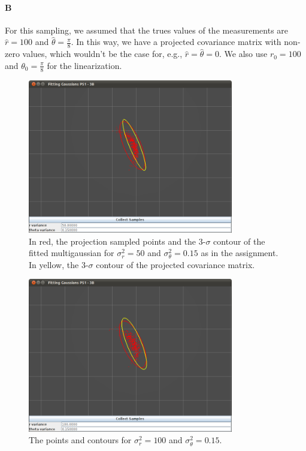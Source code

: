 \documentclass[12pt]{article}
\begin{document}
\paragraph{B} For this sampling, we assumed that the trues values of the measurements are $\hat{r}=100$ and $\hat{\theta}=\frac{\pi}{8}$. In this way, we have a projected covariance matrix with non-zero values, which wouldn't be the case for, e.g., $\hat{r}=\hat{\theta}=0$. We also use $r_0=100$ and $\theta_0=\frac{\pi}{8}$ for the linearization.

\begin{figure}
\centering
\includegraphics[width=0.8\textwidth]{figures/GaussianFit_50_0_15.png}
\caption{In red, the projection sampled points and the 3-$\sigma$ contour of the fitted multigaussian for $\sigma^2_r=50$ and $\sigma^2_\theta=0.15$ as in the assignment. In yellow, the 3-$\sigma$ contour of the projected covariance matrix.}
\label{fig:covplot_50_15}
\end{figure}

\begin{figure}
\centering
\includegraphics[width=0.8\textwidth]{figures/GaussianFit_100_0_15.png}
\caption{The points and contours for $\sigma^2_r=100$ and $\sigma^2_\theta=0.15$.}
\label{fig:covplot_100_15}
\end{figure}
\end{document}

